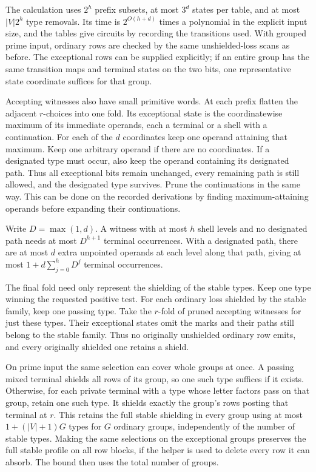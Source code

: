 The calculation uses $2^h$ prefix subsets, at most
$3^d$ states per table, and at most $|V|2^h$
type removals. Its time is $2^{O(h+d)}$ times a
polynomial in the explicit input size, and the tables
give circuits by recording the transitions used.
With grouped prime input, ordinary rows are checked
by the same unshielded-loss scans as before. The
exceptional rows can be supplied explicitly; if an
entire group has the same transition maps and
terminal states on the two bits, one representative
state coordinate suffices for that group.

Accepting witnesses also have small primitive words.
At each prefix flatten the adjacent $r$-choices into
one fold. Its exceptional state is the coordinatewise
maximum of its immediate operands, each a terminal
or a shell with a continuation. For each of the $d$
coordinates keep one operand attaining that maximum.
Keep one arbitrary operand if there are no coordinates.
If a designated type must occur, also keep the operand
containing its designated path. Thus all exceptional
bits remain unchanged, every remaining path is still
allowed, and the designated type survives. Prune the
continuations in the same way. This can be done on
the recorded derivations by finding maximum-attaining
operands before expanding their continuations.

Write $D=\max(1,d)$. A witness with at most $h$ shell
levels and no designated path needs at most $D^{h+1}$
terminal occurrences. With a designated path, there
are at most $d$ extra unpointed operands at each level
along that path, giving at most
$1+d\sum_{j=0}^h D^j$ terminal occurrences.

The final fold need only represent the shielding of
the stable types. Keep one type winning the requested
positive test. For each ordinary loss shielded by the
stable family, keep one passing type. Take the
$r$-fold of pruned accepting witnesses for just these
types. Their exceptional states omit the marks and
their paths still belong to the stable family. Thus
no originally unshielded ordinary row emits, and
every originally shielded one retains a shield.

On prime input the same selection can cover whole
groups at once. A passing mixed terminal shields all
rows of its group, so one such type suffices if it
exists. Otherwise, for each private terminal with
a type whose letter factors pass on that group,
retain one such type. It shields exactly the group's
rows posting that terminal at $r$. This retains the
full stable shielding in every group using at most
$1+(|V|+1)G$ types for $G$ ordinary groups,
independently of the number of stable types.
Making the same selections on the exceptional
groups preserves the full stable profile on all
row blocks, if the helper is used to delete every
row it can absorb. The bound then uses the total
number of groups.

